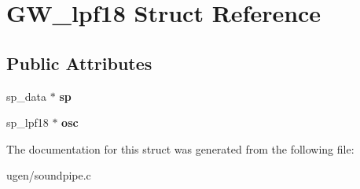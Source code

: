 \hypertarget{structGW__lpf18}{}\section{G\+W\+\_\+lpf18 Struct Reference}
\label{structGW__lpf18}
\subsection*{Public Attributes}
\begin{DoxyCompactItemize}
\item 
\hypertarget{structGW__lpf18_a9a3c7f056bcc7c5a5b147a0a5709688e}{}\label{structGW__lpf18_a9a3c7f056bcc7c5a5b147a0a5709688e} 
sp\+\_\+data $\ast$ {\bfseries sp}
\item 
\hypertarget{structGW__lpf18_a85da8133a40cd6bb20bd1a334488f675}{}\label{structGW__lpf18_a85da8133a40cd6bb20bd1a334488f675} 
sp\+\_\+lpf18 $\ast$ {\bfseries osc}
\end{DoxyCompactItemize}


The documentation for this struct was generated from the following file\+:\begin{DoxyCompactItemize}
\item 
ugen/soundpipe.\+c\end{DoxyCompactItemize}
